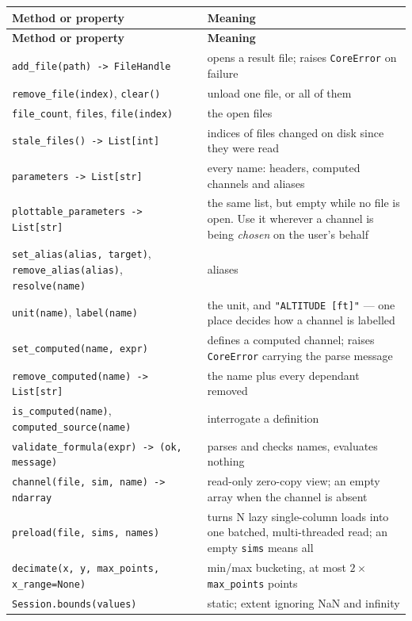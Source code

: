 \documentclass[11pt,a4paper,oneside]{report}
\newcommand{\code}[1]{\texttt{#1}}
\begin{document}
\begingroup
\small
\begin{longtable}{@{}p{}p{}@{}}
\toprule
\textbf{Method or property} & \textbf{Meaning} \\
\midrule
\endfirsthead
\toprule
\textbf{Method or property} & \textbf{Meaning} \\
\midrule
\endhead
\code{add\_file(path) -> FileHandle} & opens a result file; raises \code{CoreError} on failure \\
\code{remove\_file(index)}, \code{clear()} & unload one file, or all of them \\
\code{file\_count}, \code{files}, \code{file(index)} & the open files \\
\code{stale\_files() -> List[int]} & indices of files changed on disk since they were read \\
\code{parameters -> List[str]} & every name: headers, computed channels and aliases \\
\code{plottable\_parameters -> List[str]} & the same list, but empty while no file is open. Use it wherever a channel is being \emph{chosen} on the user's behalf \\
\code{set\_alias(alias, target)}, \code{remove\_alias(alias)}, \code{resolve(name)} & aliases \\
\code{unit(name)}, \code{label(name)} & the unit, and \code{"ALTITUDE [ft]"} --- one place decides how a channel is labelled \\
\code{set\_computed(name, expr)} & defines a computed channel; raises \code{CoreError} carrying the parse message \\
\code{remove\_computed(name) -> List[str]} & the name plus every dependant removed \\
\code{is\_computed(name)}, \code{computed\_source(name)} & interrogate a definition \\
\code{validate\_formula(expr) -> (ok, message)} & parses and checks names, evaluates nothing \\
\code{channel(file, sim, name) -> ndarray} & read-only zero-copy view; an empty array when the channel is absent \\
\code{preload(file, sims, names)} & turns N lazy single-column loads into one batched, multi-threaded read; an empty \code{sims} means all \\
\code{decimate(x, y, max\_points, x\_range=None)} & min/max bucketing, at most $2\times$\code{max\_points} points \\
\code{Session.bounds(values)} & static; extent ignoring NaN and infinity \\

\end{longtable}
\end{document}
